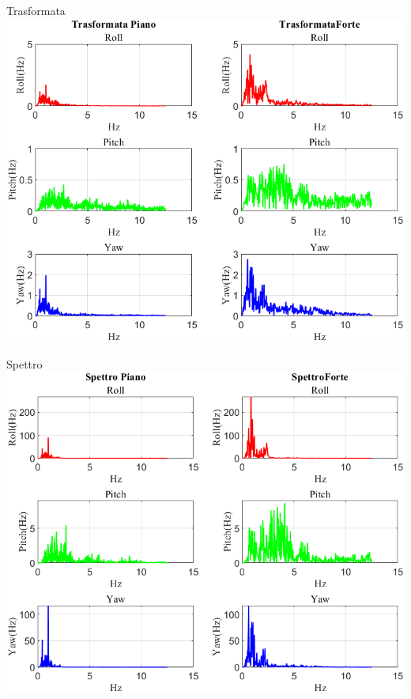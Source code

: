 \documentclass[beamer]{standalone}
\begin{document}
	
	
	\begin{frame}{{Trasformata}}
		\centering\includegraphics[height=.8\textheight]{figure/VAng/Trasformata/Trasformata}
	\end{frame}
	
	\begin{frame}{{Spettro}}
		\centering\includegraphics[height=.8\textheight]{figure/VAng/Trasformata/Spettro}
	\end{frame}
	
\end{document}
